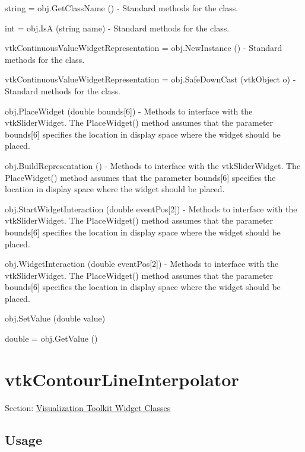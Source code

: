 \begin{DoxyItemize}
\item {\ttfamily string = obj.\-Get\-Class\-Name ()} -\/ Standard methods for the class.  
\item {\ttfamily int = obj.\-Is\-A (string name)} -\/ Standard methods for the class.  
\item {\ttfamily vtk\-Continuous\-Value\-Widget\-Representation = obj.\-New\-Instance ()} -\/ Standard methods for the class.  
\item {\ttfamily vtk\-Continuous\-Value\-Widget\-Representation = obj.\-Safe\-Down\-Cast (vtk\-Object o)} -\/ Standard methods for the class.  
\item {\ttfamily obj.\-Place\-Widget (double bounds\mbox{[}6\mbox{]})} -\/ Methods to interface with the vtk\-Slider\-Widget. The Place\-Widget() method assumes that the parameter bounds\mbox{[}6\mbox{]} specifies the location in display space where the widget should be placed.  
\item {\ttfamily obj.\-Build\-Representation ()} -\/ Methods to interface with the vtk\-Slider\-Widget. The Place\-Widget() method assumes that the parameter bounds\mbox{[}6\mbox{]} specifies the location in display space where the widget should be placed.  
\item {\ttfamily obj.\-Start\-Widget\-Interaction (double event\-Pos\mbox{[}2\mbox{]})} -\/ Methods to interface with the vtk\-Slider\-Widget. The Place\-Widget() method assumes that the parameter bounds\mbox{[}6\mbox{]} specifies the location in display space where the widget should be placed.  
\item {\ttfamily obj.\-Widget\-Interaction (double event\-Pos\mbox{[}2\mbox{]})} -\/ Methods to interface with the vtk\-Slider\-Widget. The Place\-Widget() method assumes that the parameter bounds\mbox{[}6\mbox{]} specifies the location in display space where the widget should be placed.  
\item {\ttfamily obj.\-Set\-Value (double value)}  
\item {\ttfamily double = obj.\-Get\-Value ()}  
\end{DoxyItemize}\hypertarget{vtkwidgets_vtkcontourlineinterpolator}{}\section{vtk\-Contour\-Line\-Interpolator}\label{vtkwidgets_vtkcontourlineinterpolator}
Section\-: \hyperlink{sec_vtkwidgets}{Visualization Toolkit Widget Classes} \hypertarget{vtkwidgets_vtkxyplotwidget_Usage}{}\subsection{Usage}\label{vtkwidgets_vtkxyplotwidget_Usage}

